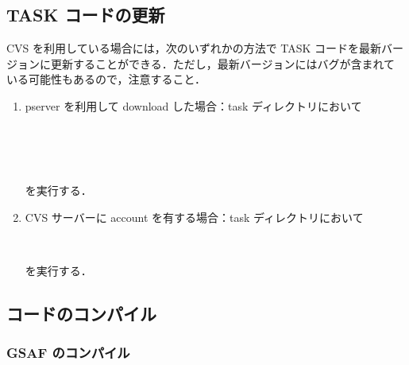 \documentclass[11pt]{jarticle}
\begin{document}
\subsection{TASK コードの更新}

CVS を利用している場合には，次のいずれかの方法で TASK コードを最新バー
ジョンに更新することができる．ただし，最新バージョンにはバグが含まれて
いる可能性もあるので，注意すること．
\begin{enumerate}
\item
pserver を利用して download した場合：task ディレクトリにおいて

 \\
 \\
 \\

を実行する．

\item
CVS サーバーに account を有する場合：task ディレクトリにおいて

 \\

を実行する．

\end{enumerate}

\subsection{コードのコンパイル}

\subsubsection{GSAF のコンパイル}
\end{document}
